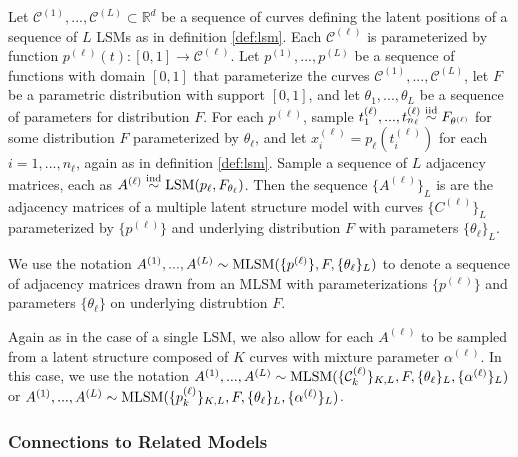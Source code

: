 \documentclass[12pt]{article}
\begin{document}
\begin{definition}
\label{def:mlsm}
Let $\mathcal{C}^{(1)}, ..., \mathcal{C}^{(L)} \subset \mathbb{R}^d$ be a sequence of curves defining the latent positions of a sequence of $L$ LSMs as in definition \ref{def:lsm}. 
Each $\mathcal{C}^{(\ell)}$ is parameterized by function $p^{(\ell)}(t) : [0, 1] \to \mathcal{C}^{(\ell)}$. 
Let $p^{(1)}, ..., p^{(L)}$ be a sequence of functions with domain $[0, 1]$ that parameterize the curves $\mathcal{C}^{(1)}, ..., \mathcal{C}^{(L)}$, let $F$ be a parametric distribution with support $[0, 1]$, and let $\theta_1, ..., \theta_L$ be a sequence of parameters for distribution $F$. 
For each $p^{(\ell)}$, sample $t_1^{(\ell)}, ..., t_{n_\ell}^{(\ell)} \stackrel{\mathrm{iid}}{\sim} F_{\theta^{(\ell)}}$ for some distribution $F$ parameterized by $\theta_\ell$, and let $x_i^{(\ell)} = p_\ell(t_i^{(\ell)})$ for each $i = 1, ..., n_\ell$, again as in definition \ref{def:lsm}. 
Sample a sequence of $L$ adjacency matrices, each as $A^{(\ell)} \stackrel{\mathrm{ind}}{\sim} \mathrm{LSM}(p_\ell, F_{\theta_\ell})$. 
Then the sequence $\{A^{(\ell)}\}_L$ is are the adjacency matrices of a multiple latent structure model with curves $\{C^{(\ell)}\}_L$ parameterized by $\{p^{(\ell)}\}$ and underlying distribution $F$ with parameters $\{\theta_\ell\}_L$. 

We use the notation $A^{(1)}, ..., A^{(L)} \sim \mathrm{MLSM}(\{p^{(\ell)}\}, F, \{\theta_\ell\}_L)$ to denote a sequence of adjacency matrices drawn from an MLSM with parameterizations $\{p^{(\ell)}\}$ and parameters $\{\theta_\ell\}$ on underlying distrubtion $F$. 
\end{definition}

\begin{remark}
\label{remark:mlsm-mixture}
Again as in the case of a single LSM, we also allow for each $A^{(\ell)}$ to be sampled from a latent structure composed of $K$ curves with mixture parameter $\alpha^{(\ell)}$. 
In this case, we use the notation $A^{(1)}, ..., A^{(L)} \sim \mathrm{MLSM}(\{\mathcal{C}_k^{(\ell)}\}_{K, L}, F, \{\theta_\ell\}_L, \{\alpha^{(\ell)}\}_L)$ or $A^{(1)}, ..., A^{(L)} \sim \mathrm{MLSM}(\{p_k^{(\ell)}\}_{K, L}, F, \{\theta_\ell\}_L, \{\alpha^{(\ell)}\}_L)$.
\end{remark}

\hypertarget{connections-to-related-models}{%
\subsubsection{Connections to Related
Models}\label{connections-to-related-models}}
\end{document}
